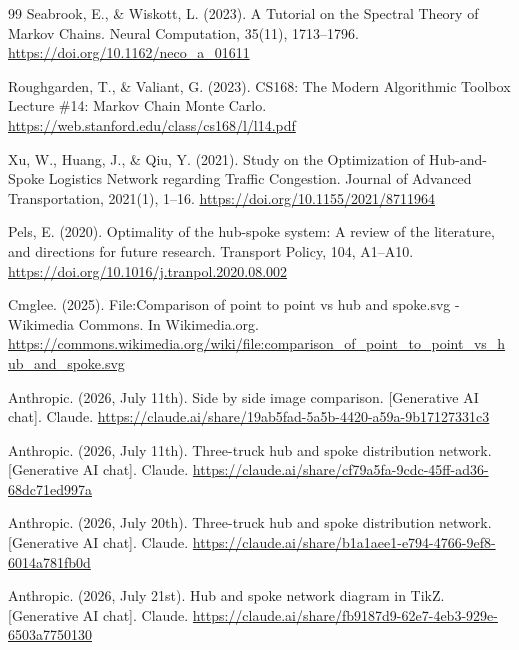 \documentclass{article}
\theoremstyle{definition}
\theoremstyle{remark}
\numberwithin{equation}{section}
\begin{document}
\begin{thebibliography}{99}
Seabrook, E., \& Wiskott, L. (2023). A Tutorial on the Spectral Theory of Markov Chains. Neural Computation, 35(11), 1713–1796. \url{https://doi.org/10.1162/neco_a_01611}

Roughgarden, T., \& Valiant, G. (2023). CS168: The Modern Algorithmic Toolbox Lecture \#14: Markov Chain Monte Carlo. \url{https://web.stanford.edu/class/cs168/l/l14.pdf}


Xu, W., Huang, J., \& Qiu, Y. (2021). Study on the Optimization of Hub-and-Spoke Logistics Network regarding Traffic Congestion. Journal of Advanced Transportation, 2021(1), 1–16. \url{https://doi.org/10.1155/2021/8711964}

Pels, E. (2020). Optimality of the hub-spoke system: A review of the literature, and directions for future research. Transport Policy, 104, A1–A10. \url{https://doi.org/10.1016/j.tranpol.2020.08.002}


Cmglee. (2025). File:Comparison of point to point vs hub and spoke.svg - Wikimedia Commons. In Wikimedia.org. \url{https://commons.wikimedia.org/wiki/file:comparison_of_point_to_point_vs_hub_and_spoke.svg}



Anthropic. (2026, July 11th). Side by side image comparison. [Generative AI chat]. Claude. \url{https://claude.ai/share/19ab5fad-5a5b-4420-a59a-9b17127331c3}

Anthropic. (2026, July 11th). Three-truck hub and spoke distribution network. [Generative AI chat]. Claude. \url{https://claude.ai/share/cf79a5fa-9cdc-45ff-ad36-68dc71ed997a}

Anthropic. (2026, July 20th). Three-truck hub and spoke distribution network. [Generative AI chat]. Claude. \url{https://claude.ai/share/b1a1aee1-e794-4766-9ef8-6014a781fb0d}

Anthropic. (2026, July 21st). Hub and spoke network diagram in TikZ. [Generative AI chat]. Claude. \url{https://claude.ai/share/fb9187d9-62e7-4eb3-929e-6503a7750130}


\end{thebibliography}
\end{document}
